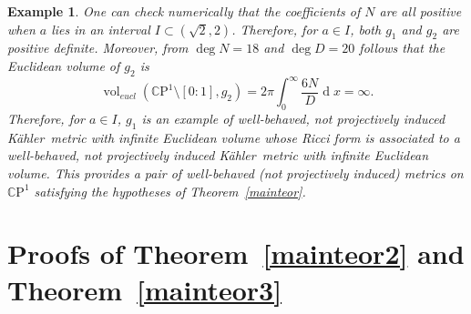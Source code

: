 \documentclass[12pt]{amsart}
\newcommand{\CP}{\mathbb{C}\mathrm{P}}
\newcommand{\K}{K\"{a}hler}
\newcommand{\di}{{\operatorname{d}}}
\newcommand{\vol}{{\operatorname{vol}}}
\newtheorem{ex}{Example}
\begin{document}
\begin{ex}
	One can check numerically that the coefficients of $N$ are all positive when $a$ lies in an interval $I\subset(\sqrt{2},2)$.
	Therefore, for $a\in I$, both $g_1$ and $g_2$ are positive definite.
	Moreover, from $\deg N=18$ and $\deg D=20$ follows that the Euclidean volume of $g_2$ is
	$$\vol_{eucl}(\CP^1\setminus [0:1], g_2)=2\pi\int_{0}^\infty\dfrac{6N}{D}\di x=\infty.$$
	Therefore, for $a\in I$, $g_1$ is an example of well-behaved, not projectively induced \K\ metric with infinite Euclidean volume whose Ricci form is associated to a  well-behaved, not projectively induced \K\ metric with infinite Euclidean volume. 
	This provides a pair of well-behaved (not projectively induced) metrics on $\CP^1$ satisfying the hypotheses of Theorem~\ref{mainteor}. 
\end{ex}




\section{Proofs of Theorem~\ref{mainteor2} and Theorem~\ref{mainteor3}}\label{SecFinal}
\end{document}
